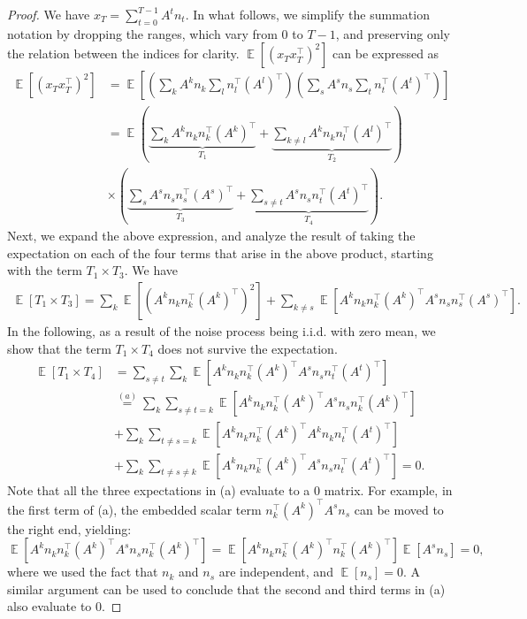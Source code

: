 \documentclass[10pt,a4paper]{amsart}
\DeclareMathOperator{\E}{\mathbb{E}}
\begin{document}
\begin{proof}
    We have $x_T = \sum_{t = 0}^{T-1} A^tn_t$. In what follows, we simplify the summation notation by dropping the ranges, which vary from $0$ to $T-1$, and preserving only the relation between the indices for clarity. $\E\left[(x_Tx_T^{\top})^2\right]$ can be expressed as
    \begin{align*}
        \E\left[(x_Tx_T^{\top})^2\right] &= \E\left[ \left( \sum_{k}A^kn_k \sum_{l}n_l^{\top}(A^l)^{\top} \right) \left( \sum_{s}A^sn_s \sum_{t}n_t^{\top}(A^t)^{\top} \right)\right] \\
        &= \E \left( \underbrace{\sum_k A^kn_kn_k^{\top}(A^k)^{\top}}_{T_1} + \underbrace{\sum_{k\neq l} A^kn_kn_l^{\top}(A^l)^{\top}}_{T_2} \right) \\
        & \times \left( \underbrace{\sum_s A^sn_sn_s^{\top}(A^s)^{\top}}_{T_3} + \underbrace{\sum_{s\neq t} A^sn_sn_t^{\top}(A^t)^{\top}}_{T_4} \right).
    \end{align*}
    Next, we expand the above expression, and analyze the result of taking the expectation on each of the four terms that arise in the above product, starting with the term $T_1 \times T_3.$ We have 
    \begin{align*}
        \E[T_1 \times T_3] = \sum_{k} \E\left[(A^kn_kn_k^{\top}(A^k)^{\top})^2\right] + \sum_{k\neq s} \E\left[ A^kn_kn_k^{\top}(A^k)^{\top} A^sn_sn_s^{\top}(A^s)^{\top}\right]. 
    \end{align*}
    In the following, as a result of the noise process being i.i.d. with zero mean, we show that the term $T_1 \times T_4$ does not survive the expectation.
    \begin{align*}
        \E[T_1 \times T_4] & = \sum_{s \neq t} \sum_k \E\left[ A^kn_kn_k^{\top}(A^k)^{\top} A^sn_sn_t^{\top}(A^t)^{\top}\right] \\
        & \overset{(a)}{=}  \sum_k \sum_{s \neq t = k} \E\left[ A^kn_kn_k^{\top}(A^k)^{\top} A^sn_sn_k^{\top}(A^k)^{\top}\right] \\
        & + \sum_k \sum_{t \neq s = k} \E\left[ A^kn_kn_k^{\top}(A^k)^{\top} A^kn_kn_t^{\top}(A^t)^{\top}\right] \\
        & + \sum_k \sum_{t \neq s \neq k} \E\left[ A^kn_kn_k^{\top}(A^k)^{\top} A^sn_sn_t^{\top}(A^t)^{\top}\right] = 0.
    \end{align*}
    Note that all the three expectations in (a) evaluate to a $0$ matrix. For example, in the first term of (a), the embedded scalar term $n_k^{\top}(A^k)^{\top} A^sn_s$ can be moved to the right end, yielding: 
    $$ \E\left[ A^kn_kn_k^{\top}(A^k)^{\top} A^sn_sn_k^{\top}(A^k)^{\top}\right] = \E\left[ A^kn_k n_k^{\top}(A^k)^{\top} n_k^{\top}(A^k)^{\top}\right]  \E\left[ A^sn_s \right] =0,$$
where we used the fact that $n_k$ and $n_s$ are independent, and $\E[n_s]=0.$ A similar argument can be used to conclude that the second and third terms in (a) also evaluate to $0$. 


\end{proof}
\end{document}
